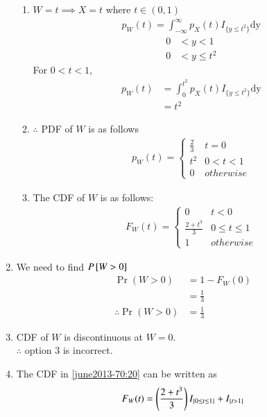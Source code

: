 \begin{enumerate}
\begin{enumerate}
\item $W=t \implies X=t $ where $t \in (0,1)$
\begin{align}
p_{W}(t) = \int_{- \infty}^{\infty} p_X(t)I_{\{y\leq t^2\}} \mathrm{dy}
\end{align}
\begin{align}
   0 &< y < 1 \label{june2013-70:16} \\
   0 &< y \leq t^2  \label{june2013-70:17}
\end{align}
For $ 0 < t < 1 $,
\begin{align}
p_W(t) &= \int_{0}^{t^2} p_X(t)I_{\{y\leq t^2\}} \mathrm{dy} \\
       &= t^2 \label{june2013-70:18}
\end{align}
\item $\therefore$ PDF of $W$ is as follows
\begin{align}
p_{W}(t)  = 
\begin{cases}
  \frac{2}{3}& t=0 \\
  t^2 & 0 < t < 1 \\
  0 & otherwise
\end{cases} \label{june2013-70:19}
\end{align}
\item The CDF  of $W$ is as follows:
\begin{align}
F_W(t)  = 
\begin{cases}
  0 & t<0 \\
  \frac{2+t^3}{3}& 0 \leq t\leq 1\\
  1 & otherwise
\end{cases} \label{june2013-70:20}
\end{align}
\end{enumerate}
\item We need to find $P{}\left[W>0\right]$
\begin{align}
\Pr(W > 0)&= 1- F_W(0) \\
           &=\frac{1}{3} \label{june2013-70:21} \\
\therefore \Pr(W>0)&=\frac{1}{3}
\end{align}
\item CDF of $W$ is discontinuous at $W=0$.\\
$\therefore$ option $3$ is incorrect.\\
\item The CDF in \eqref{june2013-70:20} can be written as
\begin{align}
  F_W(t)=\left(\frac{2+t^3}{3}\right)I_{\{0\leq t \leq 1\}}+ I_{\{t > 1\}}
\end{align}

\end{enumerate}
